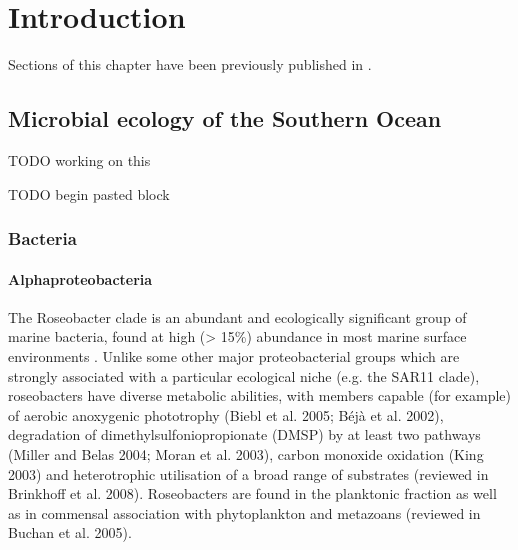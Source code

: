 \chapter{Introduction} 
\label{ch:intro}

Sections of this chapter have been previously published in .

\section{Microbial ecology of the Southern Ocean}
TODO working on this

TODO begin pasted block

\subsection{Bacteria}

\subsubsection{Alphaproteobacteria}


The Roseobacter clade is an abundant and ecologically significant group of marine bacteria, found at high (> 15\%) abundance in most marine surface environments \citep[][and references therein]{Buchan:2005hd}.
Unlike some other major proteobacterial groups which are strongly associated with a particular ecological niche (e.g. the SAR11 clade), roseobacters have diverse metabolic abilities, with members capable (for example) of aerobic anoxygenic phototrophy (Biebl et al. 2005; Béjà et al. 2002), degradation of dimethylsulfoniopropionate (DMSP) by at least two pathways (Miller and Belas 2004; Moran et al. 2003), carbon monoxide oxidation (King 2003) and heterotrophic utilisation of a broad range of substrates (reviewed in Brinkhoff et al. 2008). Roseobacters are found in the planktonic fraction as well as in commensal association with phytoplankton and metazoans (reviewed in Buchan et al. 2005).

